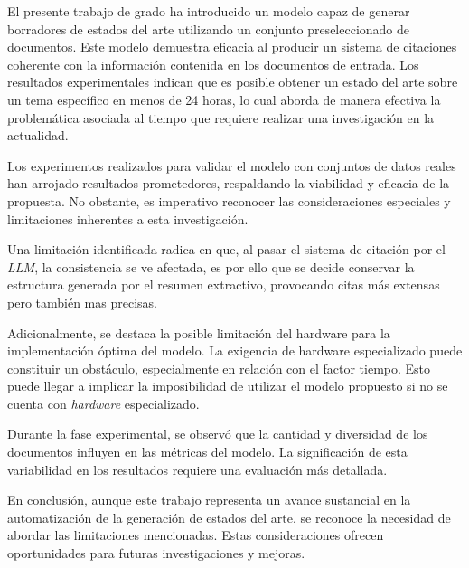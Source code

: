 \begin{conclusions}
    El presente trabajo de grado ha introducido un modelo capaz de generar borradores de estados del arte utilizando un conjunto preseleccionado de documentos. Este modelo demuestra eficacia al producir un sistema de citaciones coherente con la información contenida en los documentos de entrada. Los resultados experimentales indican que es posible obtener un estado del arte sobre un tema específico en menos de 24 horas, lo cual aborda de manera efectiva la problemática asociada al tiempo que requiere realizar una investigación en la actualidad.

    Los experimentos realizados para validar el modelo con conjuntos de datos reales han arrojado resultados prometedores, respaldando la viabilidad y eficacia de la propuesta. No obstante, es imperativo reconocer las consideraciones especiales y limitaciones inherentes a esta investigación.
    
    Una limitación identificada radica en que, al pasar el sistema de citación por el \emph{LLM}, la consistencia se ve afectada, es por ello que se decide conservar la estructura generada por el resumen extractivo, provocando citas más extensas pero también mas precisas.
    
    Adicionalmente, se destaca la posible limitación del hardware para la implementación óptima del modelo. La exigencia de hardware especializado puede constituir un obstáculo, especialmente en relación con el factor tiempo. Esto puede llegar a implicar la imposibilidad de utilizar el modelo propuesto si no se cuenta con \emph{hardware} especializado.
    
    Durante la fase experimental, se observó que la cantidad y diversidad de los documentos influyen en las métricas del modelo. La significación de esta variabilidad en los resultados requiere una evaluación más detallada.
    
    En conclusión, aunque este trabajo representa un avance sustancial en la automatización de la generación de estados del arte, se reconoce la necesidad de abordar las limitaciones mencionadas. Estas consideraciones ofrecen oportunidades para futuras investigaciones y mejoras.
\end{conclusions}
